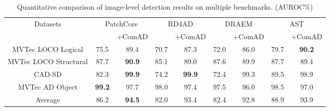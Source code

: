 \documentclass[final,5p,times,twocolumn]{elsarticle}
\begin{document}
\begin{table*}[]
\caption{Quantitative comparisons of image-level detection results on the CAD-SD dataset. (AUROC\%)}
\centering
\label{Table2}
\end{table*}

\begin{table*}[]
\caption{Quantitative comparison of image-level detection results on multiple benchmarks. (AUROC\%)}
\centering
\label{Table3}
\begin{tabular}{c|cc|cc|cc|cc}
\hline
\multirow{2}{*}{Datasets} & \multicolumn{2}{c|}{PatchCore} & \multicolumn{2}{c|}{RD4AD} & \multicolumn{2}{c|}{DRAEM} & \multicolumn{2}{c}{AST} \\ \cline{2-9} 
 &  & +ComAD &  & +ComAD &  & +ComAD &  & +ComAD \\ \hline
MVTec LOCO Logical & 75.5 & 89.4 & 70.7 & 87.3 & 72.0 & 86.0 & 79.7 & \textbf{90.2} \\
MVTec LOCO Structural & 87.7 & \textbf{90.9} & 85.1 & 89.0 & 87.6 & 89.9 & 87.7 & 89.4 \\
CAD-SD & 82.3 & \textbf{99.9} & 74.2 & \textbf{99.9} & 72.4 & 99.3 & 89.5 & 98.9 \\
MVTec AD Object & \textbf{99.2} & 97.7 & 98.0 & 97.4 & 97.5 & 96.0 & 98.5 & 97.0 \\\hline
Average & 86.2 & \textbf{94.5} & 82.0 & 93.4 & 82.4 & 92.8 & 88.9 & 93.9 \\ \hline
\end{tabular}
\end{table*}
\end{document}
